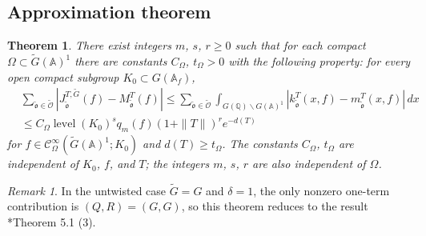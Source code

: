 \documentclass[12pt]{amsart}
\theoremstyle{definition}
\theoremstyle{plain}
\newtheorem{theorem}[definition]{Theorem}
\theoremstyle{remark}
\newtheorem{remark}[definition]{Remark}
\def\Q{\mathbb{Q}}%
\def\A{\mathbb{A}}%
\def\bs{\backslash}%
\newcommand{\cC}{\mathcal{C}}
\numberwithin{equation}{section}
\newcommand{\tG}{\widetilde{G}}
\newcommand{\tfo}{\widetilde{\mathfrak{o}}}
\newcommand{\tcO}{\widetilde{\mathcal{O}}}
\newcommand{\level}{\operatorname{level}}
\begin{document}
\subsection{Approximation theorem}\label{sec:apprpx}

\begin{theorem}\label{thm:cga}
There exist integers $m$, $s$, $r\geq0$ such that for each compact $\Omega\subset\tG(\A)^1$ there
are constants $C_\Omega$, $t_\Omega>0$ with the following property:
for every open compact subgroup $K_0\subset G(\A_f)$,
\begin{align*}
& \sum_{\tfo\in\tcO}
    |J_{\tfo}^{T,\tG}(f)-M_{\tfo}^T(f)|
 \leq\sum_{\tfo\in\tcO}\int_{G(\Q)\bs G(\A)^1}
          |k_{\tfo}^T(x,f)-m_{\tfo}^T(x,f)|\,dx\\
&\leq C_\Omega\level(K_0)^s
           q_m(f)(1+\|T\|)^r e^{-d(T)}    
\end{align*}
for $f\in\cC_\Omega^\infty(\tG(\A)^1;K_0)$ and $d(T)\geq t_\Omega$.
The constants $C_\Omega$, $t_\Omega$ are independent of $K_0$, $f$,
and $T$; the integers $m$, $s$, $r$ are also independent of $\Omega$.
\end{theorem}
\begin{remark}
In the untwisted case $\tG=G$ and $\delta=1$, the only nonzero one-term contribution is
$(Q,R)=(G,G)$, so this theorem reduces to the result \cite{FL16}*{Theorem 5.1 (3)}.
\end{remark}
\end{document}
